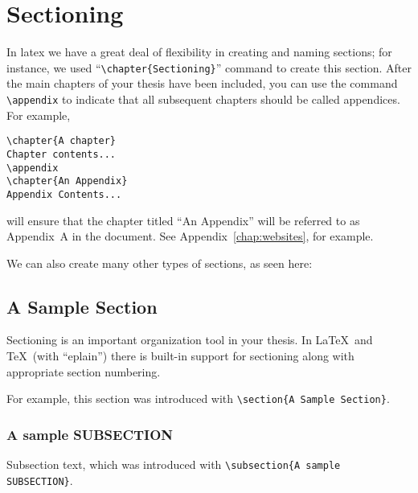 \chapter{Sectioning}

In latex we have a great deal of flexibility in creating and naming
sections; for instance, we used ``\verb|\chapter{Sectioning}|''
command to create this section. After the main chapters of your
thesis have been included, you can use the command 
\verb|\appendix| to indicate that all subsequent chapters should 
be called appendices.  For example,

\begin{verbatim}
\chapter{A chapter}
Chapter contents...
\appendix
\chapter{An Appendix}
Appendix Contents...
\end{verbatim}

\noindent will ensure that the chapter titled ``An Appendix''
will be referred to as Appendix~A in the document.  See
Appendix~\ref{chap:websites}, for example.

We can also create many other types of sections, as seen here:

\section{A Sample Section}
\label{sec:ONE}

Sectioning is an important organization tool in your thesis.
In \LaTeX\ and \TeX\ (with ``eplain'') there is built-in support for
sectioning along with appropriate section numbering. 

For example, this section was introduced with 
\verb|\section{A Sample Section}|.

\subsection{A sample SUBSECTION}
\label{sec:TWO}
Subsection text, which was introduced with 
\verb|\subsection{A sample SUBSECTION}|.
